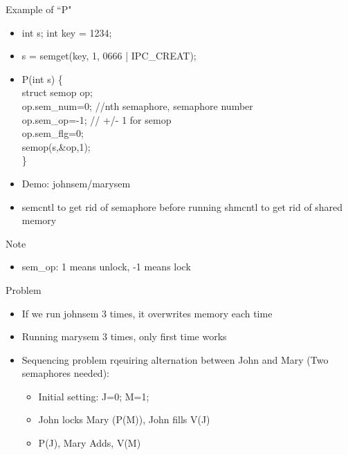 Example of ``P"
\begin{itemize}
    \item int s; int key = 1234;
    \item s = semget(key, 1, 0666 | IPC\_CREAT);
    \item P(int s) \{ \\struct semop op; \\op.sem\_num=0; //nth semaphore, semaphore number\\op.sem\_op=-1; // +/- 1 for semop\\op.sem\_flg=0;\\semop(s,\&op,1);\\\}
    \item Demo: johnsem/marysem
    \item semcntl to get rid of semaphore before running shmcntl to get rid of shared memory
\end{itemize}
Note
\begin{itemize}
    \item sem\_op: 1 means unlock, -1 means lock
\end{itemize}
Problem
\begin{itemize}
    \item If we run johnsem 3 times, it overwrites memory each time
    \item Running marysem 3 times, only first time works
    \item Sequencing problem rqeuiring alternation between John and Mary (Two semaphores needed):
    \begin{itemize}
        \item Initial setting: J=0; M=1;
        \item John locks Mary (P(M)), John fills V(J)
        \item P(J), Mary Adds, V(M)
    \end{itemize}
\end{itemize}

